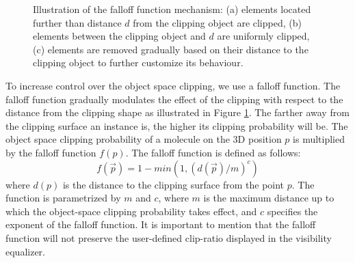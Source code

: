 \begin{figure}[t]
\centering
{}
\caption{\label{fig:falloff} 
Illustration of the falloff function mechanism: (a) elements located further than distance $d$ from the clipping object  are clipped, (b) elements between the clipping object and $d$ are uniformly clipped, (c) elements are removed gradually based on their distance to the clipping object to further customize its behaviour.}
\vspace{-5mm}
\end{figure}


To increase control over the object space clipping, we use a falloff function. 
The falloff function gradually modulates the effect of the clipping with respect to the distance from the clipping shape as illustrated in Figure \ref{fig:falloff}.
The farther away from the clipping surface an instance is, the higher its clipping probability will be.
The object space clipping probability of a molecule on the 3D position $p$ is multiplied by the falloff function $f(p)$. The falloff function is defined as follows:
\begin{equation}
	f(\vec{p}) = 1 - min(1, (d(\vec{p}) / m) ^ c)
\end{equation}
where $d(p)$ is the distance to the clipping surface from the point $p$. 
The function is parametrized by $m$ and $c$, where $m$ is the maximum distance up to which the object-space clipping probability takes effect, and $c$ specifies the exponent of the falloff function.
It is important to mention that the falloff function will not preserve the user-defined clip-ratio displayed in the visibility equalizer.

